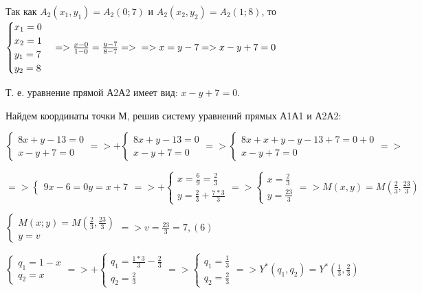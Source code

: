 Так как $A_2(x_1, y_1) = A_2(0; 7)$ и $A_2(x_2, y_2) = A_2(1; 8)$, то $\begin{cases}
  x_1 = 0 \\
  x_2 = 1 \\
  y_1 = 7 \\
  y_2 = 8
\end{cases} => \frac{x-0}{1 - 0} = \frac{y-7}{8 - 7} => \\
=> x = y-7 => x - y + 7 = 0$

Т. е. уравнение прямой А2А2 имеет вид: $x - y + 7 = 0$.

Найдем координаты точки М, решив систему уравнений прямых А1А1 и А2А2:

$\begin{cases}
  8x + y - 13 = 0 \\
  x - y + 7 = 0
\end{cases} => +\begin{cases}
  8x + y - 13 = 0 \\
  x - y + 7 = 0
\end{cases} => \begin{cases}
  8x + x + y - y - 13 + 7 = 0 + 0 \\
  x - y + 7 = 0
\end{cases} =>$

$=> \begin{cases}
  9x -6 = 0
  y = x + 7
\end{cases} => +\begin{cases}
  x = \frac{6}{9} = \frac{2}{3} \\
  y = \frac{2}{3} + \frac{7 * 3}{3}
\end{cases} => \begin{cases}
  x = \frac{2}{3} \\
  y = \frac{23}{3}
\end{cases} => M(x, y) = M(\frac{2}{3}, \frac{23}{3})$

$\begin{cases}
  M(x; y) = M(\frac{2}{3}, \frac{23}{3})\\
  y = v
\end{cases} => v = \frac{23}{3} = 7,(6)$

$\begin{cases}
  q_1 = 1 - x \\
  q_2 = x
\end{cases} => +\begin{cases}
  q_1 = \frac{1 * 3}{3} - \frac{2}{3} \\
  q_2 = \frac{2}{3}
\end{cases} => \begin{cases}
  q_1 = \frac{1}{3} \\
  q_2 = \frac{2}{3}
\end{cases} => Y^*(q_1, q_2) = Y^*(\frac{1}{3}, \frac{2}{3})$

